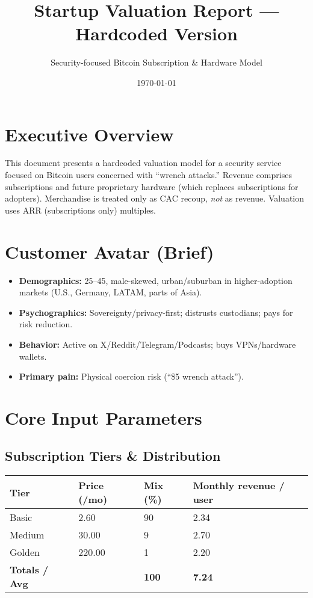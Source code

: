 \documentclass[11pt]{article}
\begin{document}
\title{Startup Valuation Report — Hardcoded Version}
\author{Security-focused Bitcoin Subscription \& Hardware Model}
\date{\today}
\maketitle

\section*{Executive Overview}
This document presents a hardcoded valuation model for a security service focused on Bitcoin users concerned with ``wrench attacks.'' Revenue comprises subscriptions and future proprietary hardware (which replaces subscriptions for adopters). Merchandise is treated only as CAC recoup, \emph{not} as revenue. Valuation uses ARR (subscriptions only) multiples.

\section{Customer Avatar (Brief)}
\begin{itemize}
  \item \textbf{Demographics:} 25--45, male-skewed, urban/suburban in higher-adoption markets (U.S., Germany, LATAM, parts of Asia).
  \item \textbf{Psychographics:} Sovereignty/privacy-first; distrusts custodians; pays for risk reduction.
  \item \textbf{Behavior:} Active on X/Reddit/Telegram/Podcasts; buys VPNs/hardware wallets.
  \item \textbf{Primary pain:} Physical coercion risk (``\$5 wrench attack'').
\end{itemize}

\section{Core Input Parameters}

\subsection*{Subscription Tiers \& Distribution}
\begin{tabularx}{\linewidth}{l Y Y Y}
\toprule
Tier & Price (/mo) & Mix (\%) & Monthly revenue / user \\\midrule
Basic   & 2.60  & 90 & 2.34 \\
Medium  & 30.00 & 9  & 2.70 \\
Golden  & 220.00& 1  & 2.20 \\\midrule
\textbf{Totals / Avg} &  & \textbf{100} & \textbf{7.24} \\
\bottomrule
\end{tabularx}
\end{document}
